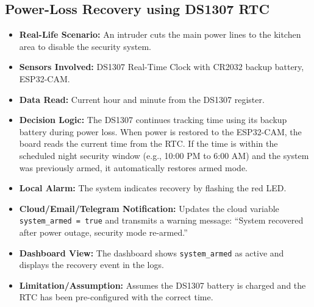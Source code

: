 \documentclass[11pt,a4paper]{report}
\begin{document}
\subsection{Power-Loss Recovery using DS1307 RTC}
\begin{itemize}
    \item \textbf{Real-Life Scenario:} An intruder cuts the main power lines to the kitchen area to disable the security system.
    \item \textbf{Sensors Involved:} DS1307 Real-Time Clock with CR2032 backup battery, ESP32-CAM.
    \item \textbf{Data Read:} Current hour and minute from the DS1307 register.
    \item \textbf{Decision Logic:} The DS1307 continues tracking time using its backup battery during power loss. When power is restored to the ESP32-CAM, the board reads the current time from the RTC. If the time is within the scheduled night security window (e.g., 10:00 PM to 6:00 AM) and the system was previously armed, it automatically restores armed mode.
    \item \textbf{Local Alarm:} The system indicates recovery by flashing the red LED.
    \item \textbf{Cloud/Email/Telegram Notification:} Updates the cloud variable \texttt{system\_armed = true} and transmits a warning message: ``System recovered after power outage, security mode re-armed.''
    \item \textbf{Dashboard View:} The dashboard shows \texttt{system\_armed} as active and displays the recovery event in the logs.
    \item \textbf{Limitation/Assumption:} Assumes the DS1307 battery is charged and the RTC has been pre-configured with the correct time.
\end{itemize}
\end{document}

